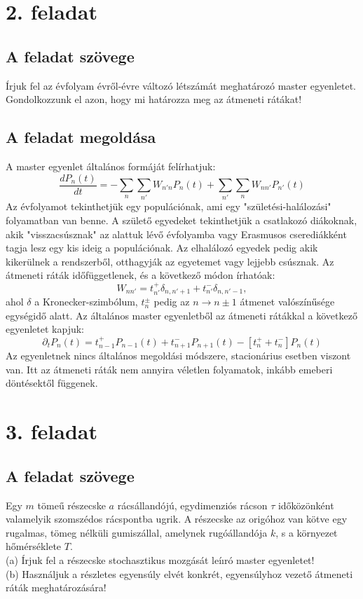\documentclass[12pt]{article}
\begin{document}
\section*{2. feladat}
\subsection*{A feladat szövege}
Írjuk fel az évfolyam évről-évre változó létszámát meghatározó master egyenletet. Gondolkozzunk el azon, hogy mi határozza meg az átmeneti rátákat!

\subsection*{A feladat megoldása}
A master egyenlet általános formáját felírhatjuk:
$$\frac{dP_n(t)}{dt} = -\sum_n\sum_{n'}W_{n'n}P_n(t)+ \sum_{n'}\sum_{n}W_{nn'}P_{n'}(t)$$
Az évfolyamot tekinthetjük egy populációnak, ami egy "születési-halálozási" folyamatban van benne.  A születő egyedeket tekinthetjük a csatlakozó diákoknak, akik "visszacsúsznak" az alattuk lévő évfolyamba vagy Erasmusos cserediákként tagja lesz egy kis ideig a populációnak. Az elhalálozó egyedek pedig akik kikerülnek a rendszerből, otthagyják az egyetemet vagy lejjebb csúsznak. Az átmeneti ráták időfüggetlenek, és a következő módon írhatóak\cite{book}:
$$W_{nn'} = t^+_{n'}\delta_{n,n'+1}+t^-_{n'}\delta_{n,n'-1},$$
ahol $\delta$ a Kronecker-szimbólum, $t^\pm_n$ pedig az $n \to n\pm1$ átmenet valószínűsége egységidő alatt. Az általános master egyenletből az átmeneti rátákkal a következő egyenletet kapjuk:
$$\partial_tP_n(t) = t^+_{n-1}P_{n-1}(t)+ t^-_{n+1}P_{n+1}(t) - [t^+_n + t^-_n]P_n(t)$$
Az egyenletnek nincs általános megoldási módszere, stacionárius esetben viszont van. Itt az átmeneti ráták nem annyira véletlen folyamatok, inkább emeberi döntésektől függenek.
\newpage
\section*{3. feladat}
\subsection*{A feladat szövege}
Egy $m$ tömeű részecske $a$ rácsállandójú, egydimenziós rácson $\tau$ időközönként valamelyik
szomszédos rácspontba ugrik. A részecske az origóhoz van kötve egy rugalmas, tömeg nélküli gumiszállal, amelynek rugóállandója $k$, s a környezet hőmérséklete $T$.\\
(a) Írjuk fel a részecske stochasztikus mozgását leíıró master egyenletet!\\
(b) Használjuk a részletes egyensúly elvét konkrét, egyensúlyhoz vezető átmeneti ráták meghatározására!
\end{document}
